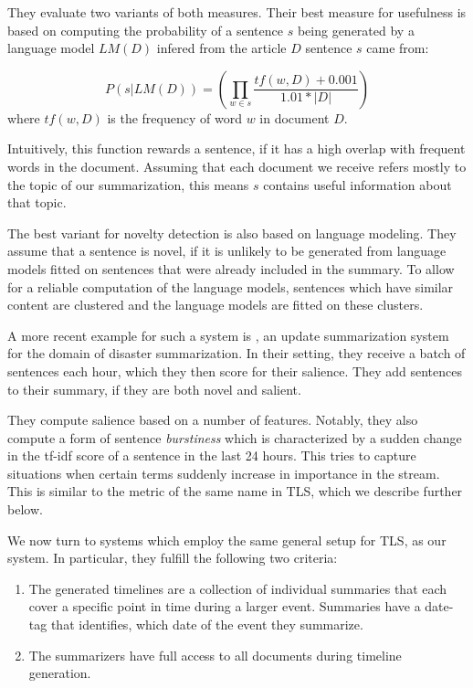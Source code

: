 \documentclass[a4paper,BCOR=10mm]{report}
\numberwithin{lemma}{chapter}
\numberwithin{definition}{chapter}
\begin{document}
They evaluate two variants of both measures.
Their best measure for usefulness is based on computing the probability of a sentence $s$ being generated by a language model $LM(D)$ infered from the article $D$ sentence $s$ came from:

\begin{equation}
P(s|LM(D)) = (\prod_{w \in s} \frac{\mathit{tf}(w, D) + 0.001}{1.01 * |D|})
\end{equation}
where $\mathit{tf(w, D)}$ is the frequency of word $w$ in document $D$.

Intuitively, this function rewards a sentence, if it has a high overlap with frequent words in the document. Assuming that each document we receive refers mostly to the topic of our summarization, this means $s$ contains useful information about that topic.

The best variant for novelty detection is also based on language modeling.
They assume that a sentence is novel, if it is unlikely to be generated from language models fitted on sentences that were already included in the summary. To allow for a reliable computation of the language models, sentences which have similar content are clustered and the language models are fitted on these clusters.

A more recent example for such a system is \citet{salient-updates}, an update summarization system for the domain of disaster summarization.
In their setting, they receive a batch of sentences each hour, which they then score for their salience. They add sentences to their summary, if they are both novel and salient.

They compute salience based on a number of features. Notably, they also compute a form of sentence \textit{burstiness} which is characterized by a sudden change in the tf-idf score of a sentence in the last 24 hours. This tries to capture situations when certain terms suddenly increase in importance in the stream. This is similar to the metric of the same name in TLS, which we describe further below.

We now turn to systems which employ the same general setup for TLS, as our system. In particular, they fulfill the following two criteria:

\begin{enumerate}
    \item{The generated timelines are a collection of individual summaries that each cover a specific point in time during a larger event. Summaries have a date-tag that identifies, which date of the event they summarize.}
    \item{The summarizers have full access to all documents during timeline generation.}
\end{enumerate}
\end{document}
